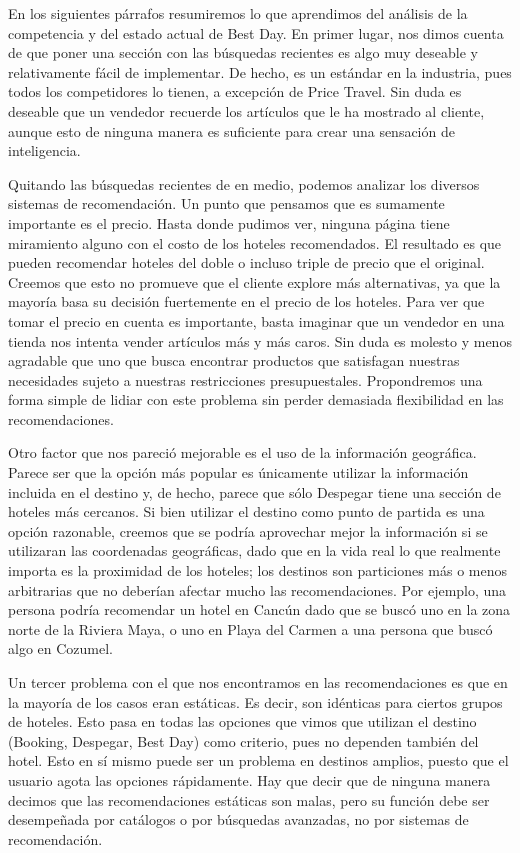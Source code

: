 \documentclass[12pt]{report}
\begin{document}
En los siguientes párrafos resumiremos lo que aprendimos del análisis de la competencia y del estado actual de Best Day. En primer lugar, nos dimos cuenta de que poner una sección con las búsquedas recientes es algo muy deseable y relativamente fácil de implementar. De hecho, es un estándar en la industria, pues todos los competidores lo tienen, a excepción de Price Travel. Sin duda es deseable que un vendedor recuerde los artículos que le ha mostrado al cliente, aunque esto de ninguna manera es suficiente para crear una sensación de inteligencia.

Quitando las búsquedas recientes de en medio, podemos analizar los diversos sistemas de recomendación. Un punto que pensamos que es sumamente importante es el precio. Hasta donde pudimos ver, ninguna página tiene miramiento alguno con el costo de los hoteles recomendados. El resultado es que pueden recomendar hoteles del doble o incluso triple de precio que el original. Creemos que esto no promueve que el cliente explore más alternativas, ya que la mayoría basa su decisión fuertemente en el precio de los hoteles. Para ver que tomar el precio en cuenta es importante, basta imaginar que un vendedor en una tienda nos intenta vender artículos más y más caros. Sin duda es molesto y menos agradable que uno que busca encontrar productos que satisfagan nuestras necesidades sujeto a nuestras restricciones presupuestales. Propondremos una forma simple de lidiar con este problema sin perder demasiada flexibilidad en las recomendaciones.

Otro factor que nos pareció mejorable es el uso de la información geográfica. Parece ser que la opción más popular es únicamente utilizar la información incluida en el destino y, de hecho, parece que sólo Despegar tiene una sección de hoteles más cercanos. Si bien utilizar el destino como punto de partida es una opción razonable, creemos que se podría aprovechar mejor la información si se utilizaran las coordenadas geográficas, dado que en la vida real lo que realmente importa es la proximidad de los hoteles; los destinos son particiones más o menos arbitrarias que no deberían afectar mucho las recomendaciones. Por ejemplo, una persona podría recomendar un hotel en Cancún dado que se buscó uno en la zona norte de la Riviera Maya, o uno en Playa del Carmen a una persona que buscó algo en Cozumel.

Un tercer problema con el que nos encontramos en las recomendaciones es que en la mayoría de los casos eran estáticas. Es decir, son idénticas para ciertos grupos de hoteles. Esto pasa en todas las opciones que vimos que utilizan el destino (Booking, Despegar, Best Day) como criterio, pues no dependen también del hotel. Esto en sí mismo puede ser un problema en destinos amplios, puesto que el usuario agota las opciones rápidamente. Hay que decir que de ninguna manera decimos que las recomendaciones estáticas son malas, pero su función debe ser desempeñada por catálogos o por búsquedas avanzadas, no por sistemas de recomendación.
\end{document}
